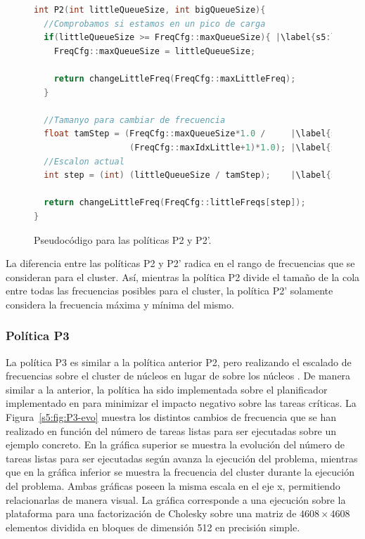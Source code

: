 \begin{figure}
  \centering

  \begin{lstlisting}[language=C++]
int P2(int littleQueueSize, int bigQueueSize){      
  //Comprobamos si estamos en un pico de carga
  if(littleQueueSize >= FreqCfg::maxQueueSize){ |\label{s5:lst:p2-detectPico}|
    FreqCfg::maxQueueSize = littleQueueSize;

    return changeLittleFreq(FreqCfg::maxLittleFreq);
  }

  //Tamanyo para cambiar de frecuencia
  float tamStep = (FreqCfg::maxQueueSize*1.0 /     |\label{s5:lst:p2-tamStep1}|
                   (FreqCfg::maxIdxLittle+1)*1.0); |\label{s5:lst:p2-tamStep2}|
  //Escalon actual
  int step = (int) (littleQueueSize / tamStep);    |\label{s5:lst:p2-step}|

  return changeLittleFreq(FreqCfg::littleFreqs[step]);
}
  \end{lstlisting}

  \caption{Pseudocódigo para las políticas P2 y P2'.}

  \label{s5:fig:listing-p2}
\end{figure}

La diferencia entre las políticas P2 y P2' radica en el rango de
frecuencias que se consideran para el cluster. Así, mientras la política P2
divide el tamaño de la cola entre todas las frecuencias posibles para el
cluster, la política P2' solamente considera la frecuencia máxima y mínima
del mismo.

\subsubsection{Política P3}

La política P3 es similar a la política anterior P2, pero realizando el
escalado de frecuencias sobre el cluster de núcleos \BIG en lugar de sobre los núcleos
\LITTLE. De manera similar a la anterior, la política ha sido implementada
sobre el planificador \botlev implementado en \ompss para 
minimizar el impacto negativo sobre las tareas críticas. La
Figura~\ref{s5:fig:P3-evo} muestra los distintos cambios de frecuencia que
se han realizado en función del número de tareas listas para ser
ejecutadas sobre un ejemplo concreto. En la gráfica superior se muestra la evolución del número de
tareas listas para ser ejecutadas según avanza la ejecución del problema,
mientras que en la gráfica inferior se muestra la frecuencia del cluster
\BIG durante la ejecución del problema. Ambas gráficas poseen la misma
escala en el eje x, permitiendo relacionarlas de manera visual. La gráfica
corresponde a una ejecución sobre la plataforma \juno para una factorización
de Cholesky sobre una matriz de $4608 \times 4608$ elementos dividida en bloques
de dimensión 512 en precisión simple.


